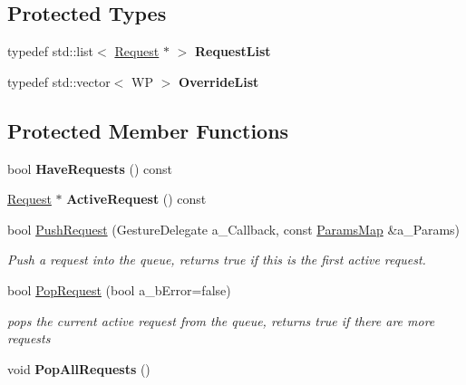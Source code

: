 \subsection*{Protected Types}
\begin{DoxyCompactItemize}
\item 
\mbox{\label{class_i_gesture_a12f8bdd79d5804d2c44946c3c17d2867}} 
typedef std\+::list$<$ \hyperlink{struct_i_gesture_1_1_request}{Request} $\ast$ $>$ {\bfseries Request\+List}
\item 
\mbox{\label{class_i_gesture_ac93248133f6daa9e048478b1c836b217}} 
typedef std\+::vector$<$ WP $>$ {\bfseries Override\+List}
\end{DoxyCompactItemize}
\subsection*{Protected Member Functions}
\begin{DoxyCompactItemize}
\item 
\mbox{\label{class_i_gesture_ab0cbdbb592255aae7160e49530d22637}} 
bool {\bfseries Have\+Requests} () const
\item 
\mbox{\label{class_i_gesture_a15b70361f0efdb3ab0ae464cc30b6e9c}} 
\hyperlink{struct_i_gesture_1_1_request}{Request} $\ast$ {\bfseries Active\+Request} () const
\item 
\mbox{\label{class_i_gesture_a2a4006d6d6159cc049037244dfce50a5}} 
bool \hyperlink{class_i_gesture_a2a4006d6d6159cc049037244dfce50a5}{Push\+Request} (Gesture\+Delegate a\+\_\+\+Callback, const \hyperlink{class_params_map}{Params\+Map} \&a\+\_\+\+Params)
\begin{DoxyCompactList}\small\item\em Push a request into the queue, returns true if this is the first active request. \end{DoxyCompactList}\item 
\mbox{\label{class_i_gesture_a63dcd92051bd943f4aee0eb9be868677}} 
bool \hyperlink{class_i_gesture_a63dcd92051bd943f4aee0eb9be868677}{Pop\+Request} (bool a\+\_\+b\+Error=false)
\begin{DoxyCompactList}\small\item\em pops the current active request from the queue, returns true if there are more requests \end{DoxyCompactList}\item 
\mbox{\label{class_i_gesture_acc5979659111c095f7a8477f4737155e}} 
void {\bfseries Pop\+All\+Requests} ()
\end{DoxyCompactItemize}

